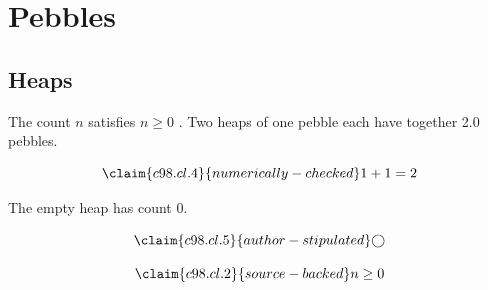 \chapter{Pebbles}\label{c98}
\section{Heaps}\label{c98.s1}

\begin{theorem}[Count]\label{c98.thm.count}
  The count $n$ satisfies $n \geq 0$ .
  Two heaps of one pebble each have together
  \num[c98.cl.4]{2.0}{} pebbles.
\end{theorem}

\begin{equation}\label{c98.eq.sum}\claim{c98.cl.4}{numerically-checked}
  1 + 1 = 2
\end{equation}

\begin{lemma}[Empty]\label{c98.lem.empty}
  The empty heap has count $0$.
\end{lemma}

\begin{equation}\label{c98.eq.circle}\claim{c98.cl.5}{author-stipulated}
  \bigcirc
\end{equation}

\begin{vertiefung}[id=c98.v1, titel={T}, wozu={W}, voraussetzung={V}, zurueck={Z}]
  \begin{equation}\label{c98.eq.page}\claim{c98.cl.2}{source-backed}
    n \geq 0
  \end{equation}
\end{vertiefung}
